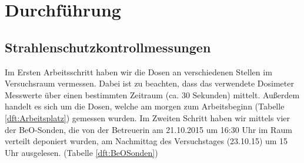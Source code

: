 \section{Durchführung}

\subsection{Strahlenschutzkontrollmessungen}
Im Ersten Arbeitsschritt haben wir die Dosen an verschiedenen Stellen im Versuchsraum vermessen. Dabei ist zu beachten, dass das verwendete Dosimeter Messwerte über einen bestimmten Zeitraum (ca. 30 Sekunden) mittelt. Außerdem handelt es sich um die Dosen, welche am morgen zum Arbeitsbeginn (Tabelle \ref{dft:Arbeitsplatz}) gemessen wurden. 
Im Zweiten Schritt haben wir mittels vier der BeO-Sonden, die von der Betreuerin am 21.10.2015 um 16:30 Uhr im Raum verteilt deponiert wurden, am Nachmittag des Versuchstages (23.10.15) um 15 Uhr ausgelesen. (Tabelle \ref{dft:BeOSonden}) \\

